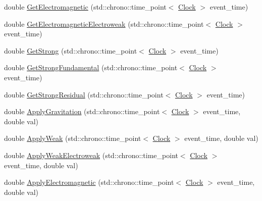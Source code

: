 \begin{DoxyCompactItemize}
\item 
double \mbox{\hyperlink{classCompositeForceParticle_a8ef336fed7e33d52a3baae4bd4dd32fd}{Get\+Electromagnetic}} (std\+::chrono\+::time\+\_\+point$<$ \mbox{\hyperlink{universe_8h_a0ef8d951d1ca5ab3cfaf7ab4c7a6fd80}{Clock}} $>$ event\+\_\+time)
\item 
double \mbox{\hyperlink{classCompositeForceParticle_ac26d7aab0daefcf13c68aba9e0f2ed53}{Get\+Electromagnetic\+Electroweak}} (std\+::chrono\+::time\+\_\+point$<$ \mbox{\hyperlink{universe_8h_a0ef8d951d1ca5ab3cfaf7ab4c7a6fd80}{Clock}} $>$ event\+\_\+time)
\item 
double \mbox{\hyperlink{classCompositeForceParticle_a9818d469c9841eaf77fbe329b0953354}{Get\+Strong}} (std\+::chrono\+::time\+\_\+point$<$ \mbox{\hyperlink{universe_8h_a0ef8d951d1ca5ab3cfaf7ab4c7a6fd80}{Clock}} $>$ event\+\_\+time)
\item 
double \mbox{\hyperlink{classCompositeForceParticle_abc8597f3b4f7cf755ab4618bd624b046}{Get\+Strong\+Fundamental}} (std\+::chrono\+::time\+\_\+point$<$ \mbox{\hyperlink{universe_8h_a0ef8d951d1ca5ab3cfaf7ab4c7a6fd80}{Clock}} $>$ event\+\_\+time)
\item 
double \mbox{\hyperlink{classCompositeForceParticle_a24214566eb5b44340d5563b6583052e8}{Get\+Strong\+Residual}} (std\+::chrono\+::time\+\_\+point$<$ \mbox{\hyperlink{universe_8h_a0ef8d951d1ca5ab3cfaf7ab4c7a6fd80}{Clock}} $>$ event\+\_\+time)
\item 
double \mbox{\hyperlink{classCompositeForceParticle_ae26a03c2970a3825e8583a811339b28d}{Apply\+Gravitation}} (std\+::chrono\+::time\+\_\+point$<$ \mbox{\hyperlink{universe_8h_a0ef8d951d1ca5ab3cfaf7ab4c7a6fd80}{Clock}} $>$ event\+\_\+time, double val)
\item 
double \mbox{\hyperlink{classCompositeForceParticle_a1fd171a0c6fab0cbf9a45a0d24607bde}{Apply\+Weak}} (std\+::chrono\+::time\+\_\+point$<$ \mbox{\hyperlink{universe_8h_a0ef8d951d1ca5ab3cfaf7ab4c7a6fd80}{Clock}} $>$ event\+\_\+time, double val)
\item 
double \mbox{\hyperlink{classCompositeForceParticle_a3c1c0b427c633f0685f1d812e02b92ff}{Apply\+Weak\+Electroweak}} (std\+::chrono\+::time\+\_\+point$<$ \mbox{\hyperlink{universe_8h_a0ef8d951d1ca5ab3cfaf7ab4c7a6fd80}{Clock}} $>$ event\+\_\+time, double val)
\item 
double \mbox{\hyperlink{classCompositeForceParticle_afa4dc18258722b3c85fbc9789a4297a5}{Apply\+Electromagnetic}} (std\+::chrono\+::time\+\_\+point$<$ \mbox{\hyperlink{universe_8h_a0ef8d951d1ca5ab3cfaf7ab4c7a6fd80}{Clock}} $>$ event\+\_\+time, double val)

\end{DoxyCompactItemize}
